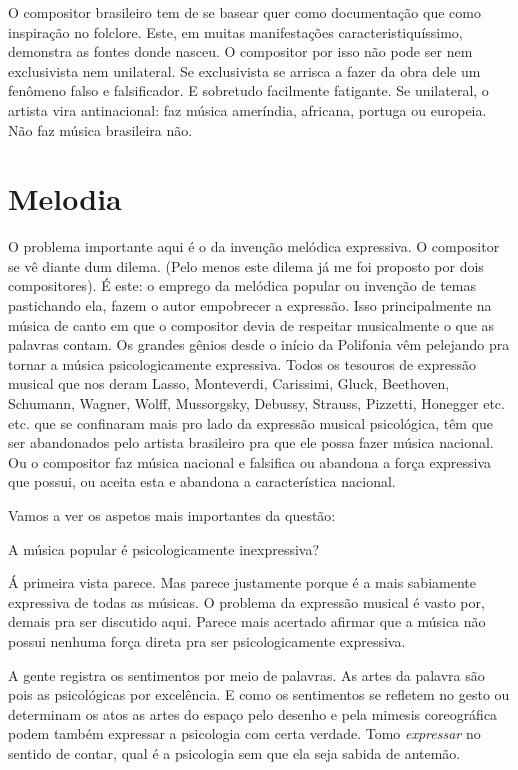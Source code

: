 O compositor brasileiro tem de se basear quer como documentação que como
inspiração no folclore. Este, em muitas manifestações
caracteristiquíssimo, demonstra as fontes donde nasceu. O compositor por
isso não pode ser nem exclusivista nem unilateral. Se exclusivista se
arrisca a fazer da obra dele um fenômeno falso e falsificador. E
sobretudo facilmente fatigante. Se unilateral, o artista vira
antinacional: faz música ameríndia, africana, portuga ou europeia. Não
faz música brasileira não.

\section{Melodia}

O problema importante aqui é o da invenção melódica expressiva. O
compositor se vê diante dum dilema. (Pelo menos este dilema já me foi
proposto por dois compositores). É este: o emprego da melódica popular
ou invenção de temas pastichando ela, fazem o autor empobrecer a
expressão. Isso principalmente na música de canto em que o compositor
devia de respeitar musicalmente o que as palavras contam. Os grandes
gênios desde o início da Polifonia vêm pelejando pra tornar a música
psicologicamente expressiva. Todos os tesouros de expressão musical que
nos deram Lasso, Monteverdi, Carissimi, Gluck, Beethoven, Schumann,
Wagner, Wolff, Mussorgsky, Debussy, Strauss, Pizzetti, Honegger etc.
etc. que se confinaram mais pro lado da expressão musical psicológica,
têm que ser abandonados pelo artista brasileiro pra que ele possa fazer
música nacional. Ou o compositor faz música nacional e falsifica ou
abandona a força expressiva que possui, ou aceita esta e abandona a
característica nacional.

Vamos a ver os aspetos mais importantes da questão:

A música popular é psicologicamente inexpressiva?

Á primeira vista parece. Mas parece justamente porque é a mais
sabiamente expressiva de todas as músicas. O problema da expressão
musical é vasto por, demais pra ser discutido aqui. Parece mais acertado
afirmar que a música não possui nenhuma força direta pra ser
psicologicamente expressiva.

A gente registra os sentimentos por meio de palavras. As artes da
palavra são pois as psicológicas por excelência. E como os sentimentos
se refletem no gesto ou determinam os atos as artes do espaço pelo
desenho e pela mimesis coreográfica podem também expressar a psicologia
com certa verdade. Tomo \emph{expressar} no sentido de contar, qual é a
psicologia sem que ela seja sabida de antemão.

